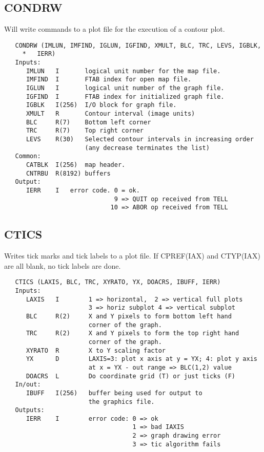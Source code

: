 \subsection{CONDRW}
Will write commands to a plot file for the execution of
a contour plot.
\begin{verbatim}
   CONDRW (IMLUN, IMFIND, IGLUN, IGFIND, XMULT, BLC, TRC, LEVS, IGBLK,
     *   IERR)
   Inputs:
      IMLUN   I       logical unit number for the map file.
      IMFIND  I       FTAB index for open map file.
      IGLUN   I       logical unit number of the graph file.
      IGFIND  I       FTAB index for initialized graph file.
      IGBLK   I(256)  I/O block for graph file.
      XMULT   R       Contour interval (image units)
      BLC     R(7)    Bottom left corner
      TRC     R(7)    Top right corner
      LEVS    R(30)   Selected contour intervals in increasing order
                      (any decrease terminates the list)
   Common:
      CATBLK  I(256)  map header.
      CNTRBU  R(8192) buffers
   Output:
      IERR    I   error code. 0 = ok.
                              9 => QUIT op received from TELL
                             10 => ABOR op received from TELL

\end{verbatim}

\subsection{CTICS}
Writes tick marks and tick labels to a plot file.
If CPREF(IAX) and CTYP(IAX) are all blank, no tick labels are done.
\begin{verbatim}
   CTICS (LAXIS, BLC, TRC, XYRATO, YX, DOACRS, IBUFF, IERR)
   Inputs:
      LAXIS   I        1 => horizontal,  2 => vertical full plots
                       3 => horiz subplot 4 => vertical subplot
      BLC     R(2)     X and Y pixels to form bottom left hand
                       corner of the graph.
      TRC     R(2)     X and Y pixels to form the top right hand
                       corner of the graph.
      XYRATO  R        X to Y scaling factor
      YX      D        LAXIS=3: plot x axis at y = YX; 4: plot y axis
                       at x = YX - out range => BLC(1,2) value
      DOACRS  L        Do coordinate grid (T) or just ticks (F)
   In/out:
      IBUFF   I(256)   buffer being used for output to
                       the graphics file.
   Outputs:
      IERR    I        error code: 0 => ok
                                   1 => bad IAXIS
                                   2 => graph drawing error
                                   3 => tic algorithm fails

\end{verbatim}

